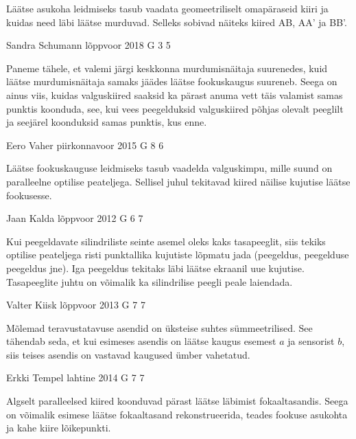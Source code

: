 \documentclass[11pt]{article}
\begin{document}
{{\ifHint
Läätse asukoha leidmiseks tasub vaadata geomeetriliselt omapäraseid kiiri ja kuidas need läbi läätse murduvad. Selleks sobivad näiteks kiired AB, AA' ja BB'.
\fi
}

{Sandra Schumann} %
{lõppvoor} %
{2018} %
{G 3} %
{5} %
{

\ifHint
Paneme tähele, et valemi järgi keskkonna murdumisnäitaja suurenedes, kuid läätse murdumisnäitaja samaks jäädes läätse fookuskaugus suureneb. Seega on ainus viis, kuidas valguskiired saaksid ka pärast anuma vett täis valamist samas punktis koonduda, see, kui vees peegelduksid valguskiired põhjas olevalt peeglilt ja seejärel koonduksid samas punktis, kus enne.
\fi
}

{Eero Vaher} %
{piirkonnavoor} %
{2015} %
{G 8} %
{6} %
{

\ifHint
Läätse fookuskauguse leidmiseks tasub vaadelda valguskimpu, mille suund on paralleelne optilise peateljega. Sellisel juhul tekitavad kiired näilise kujutise läätse fookusesse.
\fi
}

{Jaan Kalda} %
{lõppvoor} %
{2012} %
{G 6} %
{7} %
{

\ifHint
Kui peegeldavate silindriliste seinte asemel oleks kaks tasapeeglit, siis
tekiks optilise peateljega risti punktallika kujutiste lõpmatu jada (peegeldus, peegelduse peegeldus jne). Iga peegeldus tekitaks läbi läätse ekraanil uue kujutise. Tasapeeglite juhtu on võimalik ka silindrilise peegli peale laiendada.
\fi
}

{Valter Kiisk} %
{lõppvoor} %
{2013} %
{G 7} %
{7} %
{

\ifHint
Mõlemad teravustatavuse asendid on üksteise suhtes sümmeetrilised. See tähendab seda, et kui esimeses asendis on läätse kaugus esemest $a$ ja sensorist $b$, siis teises asendis on vastavad kaugused ümber vahetatud.
\fi
}

{Erkki Tempel} %
{lahtine} %
{2014} %
{G 7} %
{7} %
{

\ifHint
Algselt paralleelsed kiired koonduvad pärast läätse läbimist fokaaltasandis. Seega on võimalik esimese läätse fokaaltasand rekonstrueerida, teades fookuse asukohta ja kahe kiire lõikepunkti.
\fi
}

}
\end{document}
